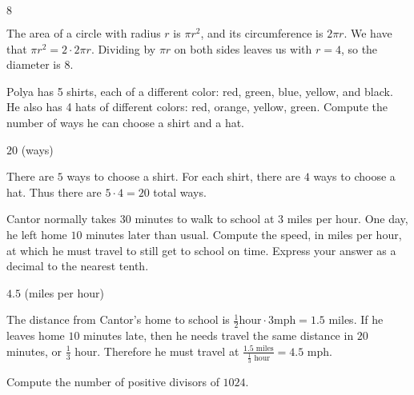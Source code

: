 \documentclass[11pt]{article}
\begin{document}
\begin{answer}
$\boxed{8}$
\end{answer}

\begin{solution}
The area of a circle with radius $r$ is $\pi r^2$, and its circumference is $2\pi r$. We have that $\pi r^2 = 2 \cdot 2\pi r$. Dividing by $\pi r$ on both sides leaves us with $r = 4$, so the diameter is $\boxed{8}$.
\end{solution}


\begin{problem}
Polya has 5 shirts, each of a different color: red, green, blue, yellow, and black. He also has 4 hats of different colors: red, orange, yellow, green. Compute the number of ways he can choose a shirt and a hat.
\end{problem}

\begin{answer}
$\boxed{20}$ (ways)
\end{answer}

\begin{solution}
There are $5$ ways to choose a shirt. For each shirt, there are $4$ ways to choose a hat. Thus there are $5 \cdot 4 = \boxed{20}$ total ways. 
\end{solution}


\begin{problem}
Cantor normally takes $30$ minutes to walk to school at $3$ miles per hour. One day, he left home $10$ minutes later than usual. Compute the speed, in miles per hour, at which he must travel to still get to school on time. Express your answer as a decimal to the nearest tenth.
\end{problem}

\begin{answer}
$\boxed{4.5}$ (miles per hour)
\end{answer}

\begin{solution}
The distance from Cantor's home to school is $\frac{1}{2} \text{hour} \cdot 3 \text{mph} = 1.5$ miles. If he leaves home $10$ minutes late, then he needs travel the same distance in $20$ minutes, or $\frac{1}{3}$ hour. Therefore he must travel at $\frac{1.5 \text{ miles}}{\frac{1}{3} \text{ hour}} = \boxed{4.5}$ mph.
\end{solution}


\begin{problem}
Compute the number of positive divisors of $1024$.
\end{problem}
\end{document}

